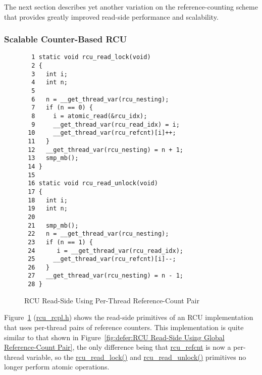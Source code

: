 The next section describes yet another variation on the reference-counting
scheme that provides greatly improved read-side performance and scalability.

\subsubsection{Scalable Counter-Based RCU}
\label{defer:Scalable Counter-Based RCU}

\begin{figure}[tbp]
{ \scriptsize
\begin{verbatim}
  1 static void rcu_read_lock(void)
  2 {
  3   int i;
  4   int n;
  5 
  6   n = __get_thread_var(rcu_nesting);
  7   if (n == 0) {
  8     i = atomic_read(&rcu_idx);
  9     __get_thread_var(rcu_read_idx) = i;
 10     __get_thread_var(rcu_refcnt)[i]++;
 11   }
 12   __get_thread_var(rcu_nesting) = n + 1;
 13   smp_mb();
 14 }
 15 
 16 static void rcu_read_unlock(void)
 17 {
 18   int i;
 19   int n;
 20 
 21   smp_mb();
 22   n = __get_thread_var(rcu_nesting);
 23   if (n == 1) {
 24      i = __get_thread_var(rcu_read_idx);
 25     __get_thread_var(rcu_refcnt)[i]--;
 26   }
 27   __get_thread_var(rcu_nesting) = n - 1;
 28 }
\end{verbatim}
}
\caption{RCU Read-Side Using Per-Thread Reference-Count Pair}
\label{fig:defer:RCU Read-Side Using Per-Thread Reference-Count Pair}
\end{figure}

Figure~\ref{fig:defer:RCU Read-Side Using Per-Thread Reference-Count Pair}
(\url{rcu_rcpl.h})
shows the read-side primitives of an RCU implementation that uses per-thread
pairs of reference counters.
This implementation is quite similar to that shown in
Figure~\ref{fig:defer:RCU Read-Side Using Global Reference-Count Pair},
the only difference being that \url{rcu_refcnt} is now a per-thread
variable, so the \url{rcu_read_lock()} and
\url{rcu_read_unlock()} primitives no longer perform atomic operations.

 \QuickQuizEnd

